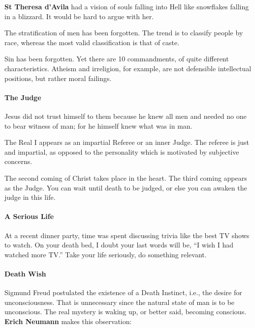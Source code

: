 \textbf{St Theresa d'Avila} had a vision of souls falling into Hell like snowflakes falling in a blizzard. It would be hard to argue with her.

The stratification of men has been forgotten. The trend is to classify people by race, whereas the most valid classification is that of caste.

Sin has been forgotten. Yet there are 10 commandments, of quite different characteristics. Atheism and irreligion, for example, are not defensible intellectual positions, but rather moral failings.

\paragraph{The Judge}


\begin{quotex}
Jesus did not trust himself to them because he knew all men and needed no one to bear witness of man; for he himself knew what was in man.
\end{quotex}


The Real I appears as an impartial Referee or an inner Judge. The referee is just and impartial, as opposed to the personality which is motivated by subjective concerns.

The second coming of Christ takes place in the heart. The third coming appears as the Judge. You can wait until death to be judged, or else you can awaken the judge in this life.

\paragraph{A Serious Life}


At a recent dinner party, time was spent discussing trivia like the best TV shows to watch. On your death bed, I doubt your last words will be, ``I wish I had watched more TV.'' Take your life seriously, do something relevant.

\paragraph{Death Wish}


Sigmund Freud postulated the existence of a Death Instinct, i.e., the desire for unconsciousness. That is unnecessary since the natural state of man is to be unconscious. The real mystery is waking up, or better said, becoming conscious. \textbf{Erich Neumann} makes this observation:

